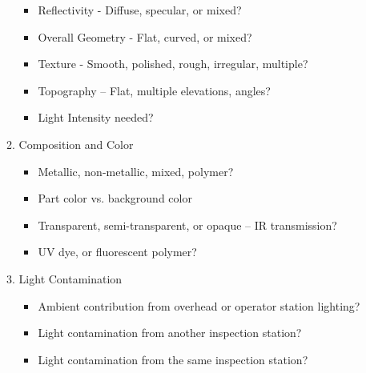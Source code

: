 \begin{enumerate}
\begin{enumerate}
\begin{itemize}
                        \item Reflectivity - Diffuse, specular, or mixed?
                        \item Overall Geometry - Flat, curved, or mixed?
                        \item Texture - Smooth, polished, rough, irregular, multiple?
                        \item Topography – Flat, multiple elevations, angles?
                        \item Light Intensity needed?
                    \end{itemize}
              \item Composition and Color
                    \begin{itemize}
                        \item Metallic, non-metallic, mixed, polymer?
                        \item Part color vs. background color
                        \item Transparent, semi-transparent, or opaque – IR transmission?
                        \item UV dye, or fluorescent polymer?
                    \end{itemize}
              \item Light Contamination
                    \begin{itemize}
                        \item Ambient contribution from overhead or operator station lighting?
                        \item Light contamination from another inspection station?
                        \item Light contamination from the same inspection station?
                    \end{itemize}
          \end{enumerate}
\end{enumerate}
